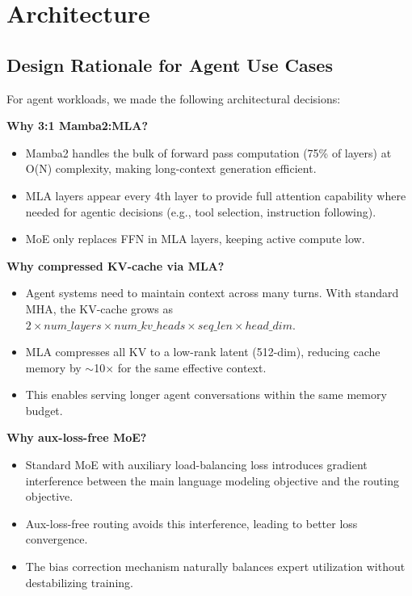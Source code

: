 \section{Architecture}
\label{sec:architecture}

\subsection{Design Rationale for Agent Use Cases}

For agent workloads, we made the following architectural decisions:

\textbf{Why 3:1 Mamba2:MLA?}
\begin{itemize}
    \item Mamba2 handles the bulk of forward pass computation (75\% of layers) at O(N) complexity, making long-context generation efficient.
    \item MLA layers appear every 4th layer to provide full attention capability where needed for agentic decisions (e.g., tool selection, instruction following).
    \item MoE only replaces FFN in MLA layers, keeping active compute low.
\end{itemize}

\textbf{Why compressed KV-cache via MLA?}
\begin{itemize}
    \item Agent systems need to maintain context across many turns. With standard MHA, the KV-cache grows as $2 \times num\_layers \times num\_kv\_heads \times seq\_len \times head\_dim$.
    \item MLA compresses all KV to a low-rank latent (512-dim), reducing cache memory by $\sim$10$\times$ for the same effective context.
    \item This enables serving longer agent conversations within the same memory budget.
\end{itemize}

\textbf{Why aux-loss-free MoE?}
\begin{itemize}
    \item Standard MoE with auxiliary load-balancing loss introduces gradient interference between the main language modeling objective and the routing objective.
    \item Aux-loss-free routing avoids this interference, leading to better loss convergence.
    \item The bias correction mechanism naturally balances expert utilization without destabilizing training.
\end{itemize}

